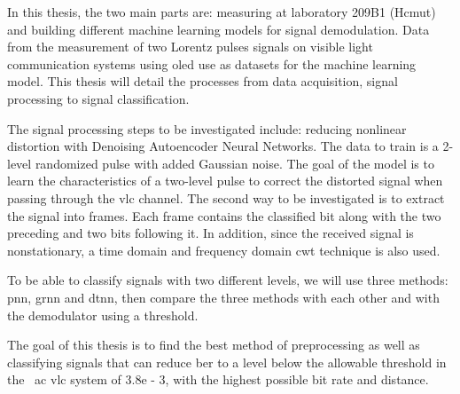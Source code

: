 In this thesis, the two main parts are: measuring at laboratory 209B1 (Hcmut) and building different machine learning models for signal demodulation. Data from the measurement of two Lorentz pulses signals on visible light communication systems using \ac{oled} use as datasets for the machine learning model. This thesis will detail the processes from data acquisition, signal processing to signal classification. 

The signal processing steps to be investigated include: reducing nonlinear distortion with Denoising Autoencoder Neural Networks. The data to train is a 2-level randomized pulse with added Gaussian noise. The goal of the model is to learn the characteristics of a two-level pulse to correct the distorted signal when passing through the \ac {vlc} channel. The second way to be investigated is to extract the signal into frames. Each frame contains the classified bit along with the two preceding and two bits following it. In addition, since the received signal is nonstationary, a time domain and frequency domain \ac{cwt} technique is also used. 

To be able to classify signals with two different levels, we will use three methods: \ac{pnn}, \ac{grnn} and \ac{dtnn}, then compare the three methods with each other and with the demodulator using a threshold. 

The goal of this thesis is to find the best method of preprocessing as well as classifying signals that can reduce \ac{ber} to a level below the allowable threshold in the \ ac {vlc} system of 3.8e - 3, with the highest possible bit rate and distance. 